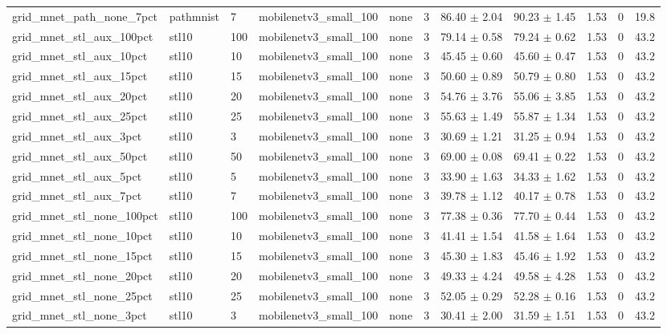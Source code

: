 \begin{tabular}{lllllllllll}
grid_mnet_path_none_7pct & pathmnist & 7 & mobilenetv3_small_100 & none & 3 & 86.40 $\pm$ 2.04 & 90.23 $\pm$ 1.45 & 1.53 & 0 & 19.8 \\
grid_mnet_stl_aux_100pct & stl10 & 100 & mobilenetv3_small_100 & none & 3 & 79.14 $\pm$ 0.58 & 79.24 $\pm$ 0.62 & 1.53 & 0 & 43.2 \\
grid_mnet_stl_aux_10pct & stl10 & 10 & mobilenetv3_small_100 & none & 3 & 45.45 $\pm$ 0.60 & 45.60 $\pm$ 0.47 & 1.53 & 0 & 43.2 \\
grid_mnet_stl_aux_15pct & stl10 & 15 & mobilenetv3_small_100 & none & 3 & 50.60 $\pm$ 0.89 & 50.79 $\pm$ 0.80 & 1.53 & 0 & 43.2 \\
grid_mnet_stl_aux_20pct & stl10 & 20 & mobilenetv3_small_100 & none & 3 & 54.76 $\pm$ 3.76 & 55.06 $\pm$ 3.85 & 1.53 & 0 & 43.2 \\
grid_mnet_stl_aux_25pct & stl10 & 25 & mobilenetv3_small_100 & none & 3 & 55.63 $\pm$ 1.49 & 55.87 $\pm$ 1.34 & 1.53 & 0 & 43.2 \\
grid_mnet_stl_aux_3pct & stl10 & 3 & mobilenetv3_small_100 & none & 3 & 30.69 $\pm$ 1.21 & 31.25 $\pm$ 0.94 & 1.53 & 0 & 43.2 \\
grid_mnet_stl_aux_50pct & stl10 & 50 & mobilenetv3_small_100 & none & 3 & 69.00 $\pm$ 0.08 & 69.41 $\pm$ 0.22 & 1.53 & 0 & 43.2 \\
grid_mnet_stl_aux_5pct & stl10 & 5 & mobilenetv3_small_100 & none & 3 & 33.90 $\pm$ 1.63 & 34.33 $\pm$ 1.62 & 1.53 & 0 & 43.2 \\
grid_mnet_stl_aux_7pct & stl10 & 7 & mobilenetv3_small_100 & none & 3 & 39.78 $\pm$ 1.12 & 40.17 $\pm$ 0.78 & 1.53 & 0 & 43.2 \\
grid_mnet_stl_none_100pct & stl10 & 100 & mobilenetv3_small_100 & none & 3 & 77.38 $\pm$ 0.36 & 77.70 $\pm$ 0.44 & 1.53 & 0 & 43.2 \\
grid_mnet_stl_none_10pct & stl10 & 10 & mobilenetv3_small_100 & none & 3 & 41.41 $\pm$ 1.54 & 41.58 $\pm$ 1.64 & 1.53 & 0 & 43.2 \\
grid_mnet_stl_none_15pct & stl10 & 15 & mobilenetv3_small_100 & none & 3 & 45.30 $\pm$ 1.83 & 45.46 $\pm$ 1.92 & 1.53 & 0 & 43.2 \\
grid_mnet_stl_none_20pct & stl10 & 20 & mobilenetv3_small_100 & none & 3 & 49.33 $\pm$ 4.24 & 49.58 $\pm$ 4.28 & 1.53 & 0 & 43.2 \\
grid_mnet_stl_none_25pct & stl10 & 25 & mobilenetv3_small_100 & none & 3 & 52.05 $\pm$ 0.29 & 52.28 $\pm$ 0.16 & 1.53 & 0 & 43.2 \\
grid_mnet_stl_none_3pct & stl10 & 3 & mobilenetv3_small_100 & none & 3 & 30.41 $\pm$ 2.00 & 31.59 $\pm$ 1.51 & 1.53 & 0 & 43.2 \\

\end{tabular}
